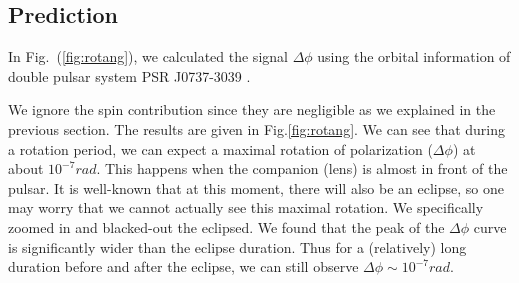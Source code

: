 \documentclass[aps,showpacs,twocolumn,floats,prd,superscriptaddress,nofootinbib]{revtex4}
\begin{document}
\subsection{Prediction}
In Fig.~(\ref{fig:rotang}), we calculated the signal $\Delta \phi$ using the orbital information of double pulsar system PSR J0737-3039 \cite{KraSta97}. 





We ignore the spin contribution since they are negligible as we explained in the previous section. 
The results are given in Fig.\ref{fig:rotang}. 
We can see that during a rotation period, we can expect a maximal rotation of polarization ($\Delta\phi$) at about $10^{-7} rad$. 
This happens when the companion (lens) is almost in front of the pulsar.
It is well-known that at this moment, there will also be an eclipse, so one may worry that we cannot actually see this maximal rotation.
We specifically zoomed in and blacked-out the eclipsed.
We found that the peak of the $\Delta\phi$ curve is significantly wider than the eclipse duration.
Thus for a (relatively) long duration before and after the eclipse, we can still observe $\Delta\phi\sim10^{-7}rad$.





\end{document}
